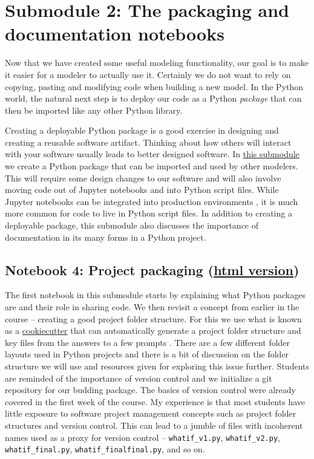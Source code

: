 \documentclass[ited,blindrev]{informs3}              %
\newcommand{\code}[1]{\texttt{#1}}
\begin{document}
\section{Submodule 2: The packaging and documentation notebooks}

Now that we have created some useful modeling functionality, our goal is to make it easier for a modeler to actually use it. Certainly we do not want to rely on copying, pasting and modifying code when building a new model. In the Python world, the natural next step is to deploy our code as a Python \textit{package} \cite{buezenWelcomePythonPackages} that can then be imported like any other Python library.

Creating a deployable Python package is a good exercise in designing and creating a reusable software artifact. Thinking about how others will interact with your software usually leads to better designed software.  In \href{http://www.sba.oakland.edu/faculty/isken/courses/mis6900/mod3b_whatif_packaging.html}{this submodule} we create a Python package that can be imported and used by other modelers. This will require some design changes to our software and will also involve moving code out of Jupyter notebooks and into Python script files. While Jupyter notebooks can be integrated into production environments \cite{uffordInteractiveNotebookInnovation2019}, it is much more common for code to live in Python script files. In addition to creating a deployable package, this submodule also discusses the importance of documentation in its many forms in a Python project.

\subsection{Notebook 4: Project packaging (\href{http://www.sba.oakland.edu/faculty/isken/excel_with_python/what_if_4_project_packaging.html}{html version})}

The first notebook in this submodule starts by explaining what Python packages are and their role in sharing code. We then revisit a concept from earlier in the course -- creating a good project folder structure. For this we use what is known as a \href{https://cookiecutter.readthedocs.io/en/stable/}{cookiecutter} that can automatically generate a project folder structure and key files from the answers to a few prompts \cite{audreyroyandcookiecuttercommunityCookiecutterBetterProject2012}. There are a few different folder layouts used in Python projects and there is a bit of discussion on the folder structure we will use and resources given for exploring this issue further. Students are reminded of the importance of version control and we initialize a git repository for our budding package. The basics of version control were already covered in the first week of the course. My experience is that most students have little exposure to software project management concepts such as project folder structures and version control. This can lead to a jumble of files with incoherent names used as a proxy for version control -- \code{whatif\_v1.py}, \code{whatif\_v2.py}, \code{whatif\_final.py}, \code{whatif\_finalfinal.py}, and so on.
\end{document}
